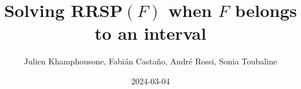 \documentclass{article}
\begin{document}
     \title{Solving RRSP$(F)$ when $F$ belongs to an interval}
     \author{Julien Khamphousone, Fabi\'an Casta\~no, Andr\'e Rossi, Sonia Toubaline}
     \date{2024-03-04}
     \maketitle
     \def\F{{0.0,0.0458716,0.2527473,0.3452381,1.7597403,2.6666667,2.9333333}}
\def\gF{{13.96999999999999999999999999999999999999999999999999999999999999999999999999998,14.45440369999999999999999999999999999999999999999999999999999999999999999999994,15.51153850000000000000000000000000000000000000000000000000000000000000000000001,15.89999999999999999999999999999999999999999999999999999999999999999999999999994,20.65272729999999999999999999999999999999999999999999999999999999999999999999992,22.30333329999999999999999999999999999999999999999999999999999999999999999999999,1916.173333333333332486603239885880643391346456643206591469142611311449186928257}}
\end{document}

